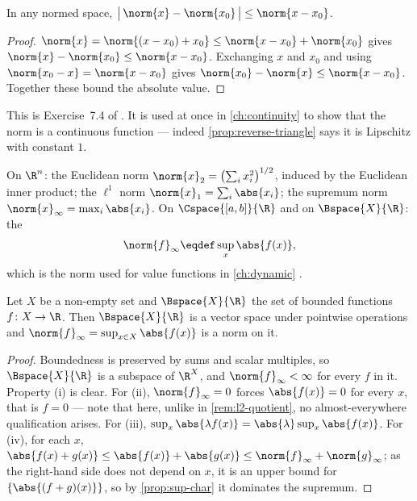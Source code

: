 \begin{proposition}\label{prop:reverse-triangle}
	In any normed space, $\bigl|\,\norm{x}-\norm{x_0}\,\bigr|\leq\norm{x-x_0}$.
\end{proposition}

\begin{proof}
	$\norm{x}=\norm{(x-x_0)+x_0}\leq\norm{x-x_0}+\norm{x_0}$ gives
	$\norm{x}-\norm{x_0}\leq\norm{x-x_0}$. Exchanging $x$ and $x_0$ and using
	$\norm{x_0-x}=\norm{x-x_0}$ gives $\norm{x_0}-\norm{x}\leq\norm{x-x_0}$.
	Together these bound the absolute value.
\end{proof}

This is Exercise~7.4 of \autocite[slide 20]{fukuda2026analysis}. It is used at
once in \autoref{ch:continuity} to show that the norm is a continuous function
--- indeed \autoref{prop:reverse-triangle} says it is Lipschitz with constant
$1$.

\begin{eg}\label{eg:norms}
	On $\R^n$: the Euclidean norm $\norm{x}_2=\bigl(\sum_ix_i^2\bigr)^{1/2}$,
	induced by the Euclidean inner product; the $\ell^1$ norm
	$\norm{x}_1=\sum_i\abs{x_i}$; the supremum norm
	$\norm{x}_\infty=\max_i\abs{x_i}$. On $\Cspace{[a,b]}{\R}$ and on
	$\Bspace{X}{\R}$: the 
	\[
		\norm{f}_\infty\eqdef\sup_{x}\abs{f(x)},
	\]
	which is the norm used for value functions in \autoref{ch:dynamic}
	\autocite[slides 21--22, 73]{fukuda2026analysis}.
\end{eg}

\begin{proposition}\label{prop:sup-norm}
	Let $X$ be a non-empty set and $\Bspace{X}{\R}$ the set of bounded functions
	$f\colon X\to\R$. Then $\Bspace{X}{\R}$ is a vector space under pointwise
	operations and $\norm{f}_\infty=\sup_{x\in X}\abs{f(x)}$ is a norm on it.
\end{proposition}

\begin{proof}
	Boundedness is preserved by sums and scalar multiples, so $\Bspace{X}{\R}$ is a
	subspace of $\R^X$, and $\norm{f}_\infty<\infty$ for every $f$ in it. Property
	(i) is clear. For (ii), $\norm{f}_\infty=0$ forces $\abs{f(x)}=0$ for every $x$,
	that is $f=0$ --- note that here, unlike in \autoref{rem:l2-quotient}, no
	almost-everywhere qualification arises. For (iii),
	$\sup_x\abs{\lambda f(x)}=\abs{\lambda}\sup_x\abs{f(x)}$. For (iv), for each $x$,
	$\abs{f(x)+g(x)}\leq\abs{f(x)}+\abs{g(x)}\leq\norm{f}_\infty+\norm{g}_\infty$;
	as the right-hand side does not depend on $x$, it is an upper bound for
	$\{\abs{(f+g)(x)}\}$, so by \autoref{prop:sup-char} it dominates the supremum.
\end{proof}

